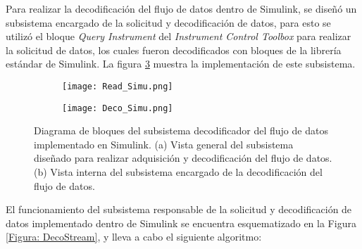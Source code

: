Para realizar la decodificación del flujo de datos dentro de Simulink\textregistered, se diseñó un subsistema encargado de la solicitud y decodificación de datos, para esto se utilizó el bloque \emph{Query Instrument} del \emph{Instrument Control Toolbox} para realizar la solicitud de datos, los cuales fueron decodificados con bloques de la librería estándar de Simulink\textregistered. La figura \ref{Figura: DecoSimuT} muestra la implementación de este subsistema.

\vfill
\begin{figure}[htbp]
	\centering
	\begin{subfigure}[htbp]{0.8\textwidth}
		\texttt{[image: Read\_Simu.png]}
		\caption{}
		\label{Figura: readSimu}
	\end{subfigure}
	\begin{subfigure}[htbp]{0.75\textwidth}
		\texttt{[image: Deco\_Simu.png]}
		\caption{}
		\label{Figura: decoSimu}
	\end{subfigure}
	\caption[Diagrama de bloques del subsistema decodificador del flujo de datos]{Diagrama de bloques del subsistema decodificador del flujo de datos implementado en Simulink\textregistered . (a) Vista general del subsistema diseñado para realizar adquisición y decodificación del flujo de datos. (b) Vista interna del subsistema encargado de la decodificación del flujo de datos.}
	\label{Figura: DecoSimuT}
\end{figure}

\newpage
El funcionamiento del subsistema responsable de la solicitud y decodificación de datos implementado dentro de Simulink\textregistered \; se encuentra esquematizado en la Figura \ref{Figura: DecoStream}, y lleva a cabo el siguiente algoritmo:

